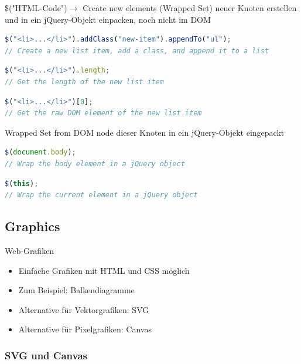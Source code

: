 \begin{definition}{\$("HTML-Code")}$\rightarrow$ Create new elements (Wrapped Set)
  neuer Knoten erstellen und in ein jQuery-Objekt einpacken, noch nicht im DOM
\begin{lstlisting}[language=JavaScript, style=basesmol]
$("<li>...</li>").addClass("new-item").appendTo("ul");
// Create a new list item, add a class, and append it to a list
\end{lstlisting}
\begin{lstlisting}[language=JavaScript, style=basesmol]
$("<li>...</li>").length;
// Get the length of the new list item
\end{lstlisting}
\begin{lstlisting}[language=JavaScript, style=basesmol]
$("<li>...</li>")[0];
// Get the raw DOM element of the new list item
\end{lstlisting}
\end{definition}

\begin{definition}{Wrapped Set from DOM node}
  dieser Knoten in ein jQuery-Objekt eingepackt
\begin{lstlisting}[language=JavaScript, style=basesmol]
$(document.body);
// Wrap the body element in a jQuery object
\end{lstlisting}
\begin{lstlisting}[language=JavaScript, style=basesmol]
$(this);
// Wrap the current element in a jQuery object
\end{lstlisting}
\end{definition}

\subsection{Graphics}

\begin{definition}{Web-Grafiken}
\begin{itemize}
  \item Einfache Grafiken mit HTML und CSS möglich
  \item Zum Beispiel: Balkendiagramme
  \item Alternative für Vektorgrafiken: SVG
  \item Alternative für Pixelgrafiken: Canvas
\end{itemize}
\end{definition}

\subsubsection{SVG und Canvas}

